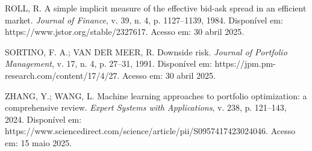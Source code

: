 \begin{thebibliography}{99}
ROLL, R. A simple implicit measure of the effective bid-ask spread in an efficient market. \textit{Journal of Finance}, v. 39, n. 4, p. 1127--1139, 1984. Disponível em: https://www.jstor.org/stable/2327617. Acesso em: 30 abril 2025.

SORTINO, F. A.; VAN DER MEER, R. Downside risk. \textit{Journal of Portfolio Management}, v. 17, n. 4, p. 27--31, 1991. Disponível em: https://jpm.pm-research.com/content/17/4/27. Acesso em: 30 abril 2025.

ZHANG, Y.; WANG, L. Machine learning approaches to portfolio optimization: a comprehensive review. \textit{Expert Systems with Applications}, v. 238, p. 121--143, 2024. Disponível em: https://www.sciencedirect.com/science/article/pii/S0957417423024046. Acesso em: 15 maio 2025.

\end{thebibliography}